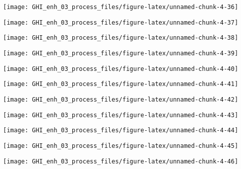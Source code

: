 \documentclass[
  10pt,
  a4paper,oneside]{article}
\begin{document}
\begin{center}\texttt{[image: GHI\_enh\_03\_process\_files/figure-latex/unnamed-chunk-4-36]} \end{center}

\begin{center}\texttt{[image: GHI\_enh\_03\_process\_files/figure-latex/unnamed-chunk-4-37]} \end{center}

\begin{center}\texttt{[image: GHI\_enh\_03\_process\_files/figure-latex/unnamed-chunk-4-38]} \end{center}

\begin{center}\texttt{[image: GHI\_enh\_03\_process\_files/figure-latex/unnamed-chunk-4-39]} \end{center}

\begin{center}\texttt{[image: GHI\_enh\_03\_process\_files/figure-latex/unnamed-chunk-4-40]} \end{center}

\begin{center}\texttt{[image: GHI\_enh\_03\_process\_files/figure-latex/unnamed-chunk-4-41]} \end{center}

\begin{center}\texttt{[image: GHI\_enh\_03\_process\_files/figure-latex/unnamed-chunk-4-42]} \end{center}

\begin{center}\texttt{[image: GHI\_enh\_03\_process\_files/figure-latex/unnamed-chunk-4-43]} \end{center}

\begin{center}\texttt{[image: GHI\_enh\_03\_process\_files/figure-latex/unnamed-chunk-4-44]} \end{center}

\begin{center}\texttt{[image: GHI\_enh\_03\_process\_files/figure-latex/unnamed-chunk-4-45]} \end{center}

\begin{center}\texttt{[image: GHI\_enh\_03\_process\_files/figure-latex/unnamed-chunk-4-46]} \end{center}
\end{document}
